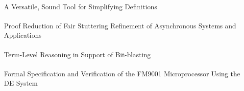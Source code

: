 \documentclass{article}
\begin{document}
\cite{17-coglio-simplify} \\
A Versatile, Sound Tool for Simplifying Definitions \\

\cite{17-sumners-refinement} \\
Proof Reduction of Fair Stuttering Refinement of Asynchronous Systems and Applications \\

\cite{17-swords-blasting} \\
Term-Level Reasoning in Support of Bit-blasting \\

\cite{17-chau-de} \\
Formal Specification and Verification of the {FM9001} Microprocessor Using the {DE} System \\




\end{document}
